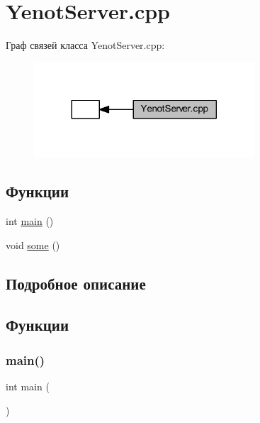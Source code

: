 \hypertarget{group__serveryenotservercpp}{}\section{Yenot\+Server.\+cpp}
\label{group__serveryenotservercpp}
Граф связей класса Yenot\+Server.\+cpp\+:
\nopagebreak
\begin{figure}[H]
\begin{center}
\leavevmode
\includegraphics[width=233pt]{group__serveryenotservercpp}
\end{center}
\end{figure}
\subsection*{Функции}
\begin{DoxyCompactItemize}
\item 
int \mbox{\hyperlink{group__serveryenotservercpp_gae66f6b31b5ad750f1fe042a706a4e3d4}{main}} ()
\item 
void \mbox{\hyperlink{group__serveryenotservercpp_ga3bf507bc2b43ea8ed45bdfeaf8d11171}{some}} ()
\end{DoxyCompactItemize}


\subsection{Подробное описание}


\subsection{Функции}
\mbox{\label{group__serveryenotservercpp_gae66f6b31b5ad750f1fe042a706a4e3d4}} 
\subsubsection{\texorpdfstring{main()}{main()}}
{\footnotesize\ttfamily int main (\begin{DoxyParamCaption}{ }\end{DoxyParamCaption})}



